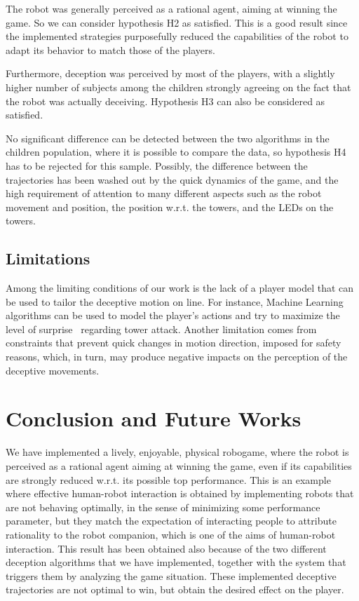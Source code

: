 
The robot was generally perceived as a rational agent, aiming at winning the game. So we can consider hypothesis H2 as satisfied. This is a good result since the implemented strategies purposefully reduced the capabilities of the robot to adapt its behavior to match those of the players.

Furthermore, deception was perceived by most of the players, with a slightly higher number of subjects among the children strongly agreeing on the fact that the robot was actually deceiving. Hypothesis H3 can also be considered as satisfied.

No significant difference can be detected between the two algorithms in the children population, where it is possible to compare the data, so hypothesis H4 has to be rejected for this sample. Possibly, the difference between the trajectories has been washed out by the quick dynamics of the game, and the high requirement of attention to many different aspects such as the robot movement and position, the position w.r.t. the towers, and the LEDs on the towers.

\subsection{Limitations}
Among the limiting conditions of our work is the lack of a player model that can be used to tailor the deceptive motion on line. For instance, Machine Learning algorithms can be used to model the player's actions and try to maximize the level of surprise~\cite{Baldi_Ittinn} regarding tower attack.
Another limitation comes from constraints that prevent quick changes in motion direction, imposed for safety reasons, which, in turn, may produce negative impacts on the perception of the deceptive movements.

\section{Conclusion and Future Works}
\label{S:Conclusion}
We have implemented a lively, enjoyable, physical robogame, where the robot is perceived as a rational agent aiming at winning the game, even if its capabilities are strongly reduced w.r.t. its possible top performance. This is an example where effective human-robot interaction is obtained by implementing robots that are not behaving optimally, in the sense of minimizing some performance parameter, but they match the expectation of interacting people to attribute rationality to the robot companion, which is one of the aims of human-robot interaction.
This result has been obtained also because of the two different deception algorithms that we have implemented, together with the system that triggers them by analyzing the game situation. These implemented deceptive trajectories are not optimal to win, but obtain the desired effect on the player. 

